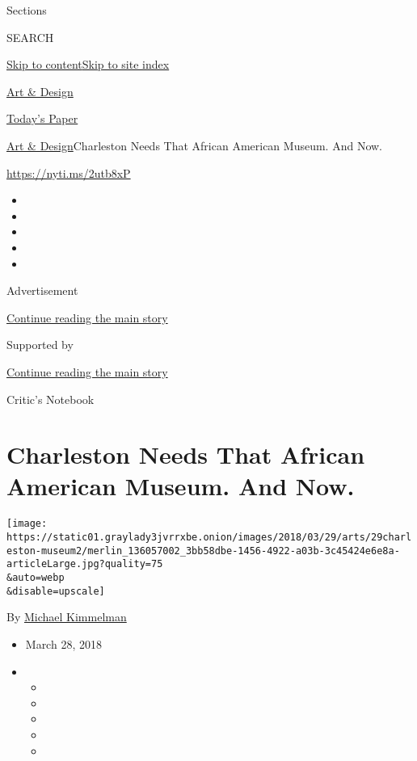 Sections

SEARCH

\protect\hyperlink{site-content}{Skip to
content}\protect\hyperlink{site-index}{Skip to site index}

\href{https://www.nytimes3xbfgragh.onion/section/arts/design}{Art \&
Design}

\href{https://myaccount.nytimes3xbfgragh.onion/auth/login?response_type=cookie\&client_id=vi}{}

\href{https://www.nytimes3xbfgragh.onion/section/todayspaper}{Today's
Paper}

\href{/section/arts/design}{Art \& Design}\textbar{}Charleston Needs
That African American Museum. And Now.

\url{https://nyti.ms/2utb8xP}

\begin{itemize}
\item
\item
\item
\item
\item
\end{itemize}

Advertisement

\protect\hyperlink{after-top}{Continue reading the main story}

Supported by

\protect\hyperlink{after-sponsor}{Continue reading the main story}

Critic's Notebook

\hypertarget{charleston-needs-that-african-american-museum-and-now}{%
\section{Charleston Needs That African American Museum. And
Now.}\label{charleston-needs-that-african-american-museum-and-now}}

\texttt{[image: https://static01.graylady3jvrrxbe.onion/images/2018/03/29/arts/29charleston-museum2/merlin\_136057002\_3bb58dbe-1456-4922-a03b-3c45424e6e8a-articleLarge.jpg?quality=75\\\&auto=webp\\\&disable=upscale]}

By \href{http://www.nytimes3xbfgragh.onion/by/michael-kimmelman}{Michael
Kimmelman}

\begin{itemize}
\item
  March 28, 2018
\item
  \begin{itemize}
  \item
  \item
  \item
  \item
  \item
  \end{itemize}
\end{itemize}

